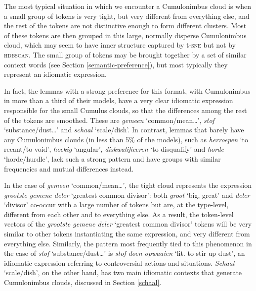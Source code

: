 \documentclass[
]{book}
\begin{document}
The most typical situation in which we encounter a Cumulonimbus cloud is when a small group of tokens is very tight, but very different from everything else, and the rest of the tokens are not distinctive enough to form different clusters. Most of these tokens are then grouped in this large, normally disperse Cumulonimbus cloud, which may seem to have inner structure captured by t-\textsc{sne} but not by \textsc{hdbscan}. The small group of tokens may be brought together by a set of similar context words (see Section \ref{semantic-preference}), but most typically they represent an idiomatic expression.

In fact, the lemmas with a strong preference for this format, with Cumulonimbus in more than a third of their models, have a very clear idiomatic expression responsible for the small Cumulus clouds, so that the differences among the rest of the tokens are smoothed. These are \emph{gemeen} `common/mean\ldots{}', \emph{stof} `substance/dust\ldots{}' and \emph{schaal} `scale/dish'. In contrast, lemmas that barely have any Cumulonimbus clouds (in less than 5\% of the models), such as \emph{herroepen} `to recant/to void', \emph{hoekig} `angular', \emph{diskwalificeren} `to disqualify' and \emph{horde} `horde/hurdle', lack such a strong pattern and have groups with similar frequencies and mutual differences instead.

In the case of \emph{gemeen} `common/mean\ldots{}', the tight cloud represents the expression \emph{grootste gemene deler} `greatest common divisor': both \emph{groot} `big, great' and \emph{deler} `divisor' co-occur with a large number of tokens but are, at the type-level, different from each other and to everything else. As a result, the token-level vectors of the \emph{grootste gemene deler} `greatest common divisor' tokens will be very similar to other tokens instantiating the same expression, and very different from everything else. Similarly, the pattern most frequently tied to this phenomenon in the case of \emph{stof} `substance/dust\ldots{}' is \emph{stof doen opwaaien} `lit. to stir up dust', an idiomatic expression referring to controversial actions and situations. \emph{Schaal} `scale/dish', on the other hand, has two main idiomatic contexts that generate Cumulonimbus clouds, discussed in Section \ref{schaal}.
\end{document}

